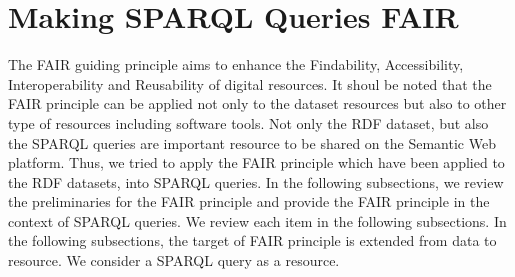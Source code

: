 \documentclass[runningheads]{llncs}
\begin{document}
\section{Making SPARQL Queries FAIR}

The FAIR guiding principle aims to enhance the Findability, Accessibility, Interoperability and Reusability of digital resources.
It shoul be noted that the FAIR principle can be applied not only to the dataset resources but also to other type of resources including software tools.
Not only the RDF dataset, but also the SPARQL queries are important resource to be shared on the Semantic Web platform. Thus, we tried to apply the FAIR principle which have been applied to the RDF datasets, into SPARQL queries.
In the following subsections, we review the preliminaries for the FAIR principle
and provide the FAIR principle in the context of SPARQL queries.
We review each item in the following subsections.
In the following subsections, the target of FAIR principle is extended from data to resource.
We consider a SPARQL query as a resource.




\end{document}
